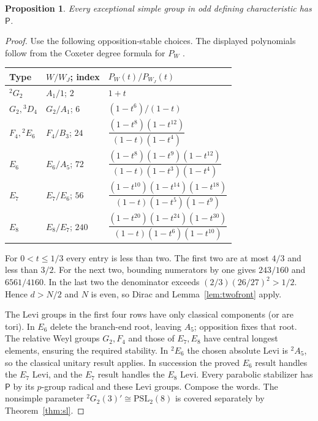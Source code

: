 \documentclass[11pt]{article}
\newtheorem{proposition}[theorem]{Proposition}
\theoremstyle{definition}
\newcommand{\Pp}{\mathsf P}
\newcommand{\PSL}{\mathrm{PSL}}
\begin{document}
\begin{proposition}\label{prop:oddexceptional}
Every exceptional simple group in odd defining characteristic has $\Pp$.
\end{proposition}
\begin{proof}
Use the following opposition-stable choices. The displayed polynomials follow from the Coxeter degree formula for $P_W$ \cite{Humphreys}.
\begin{center}\small
\begin{tabular}{lll}
\toprule
Type & $W/W_J$; index & $P_W(t)/P_{W_J}(t)$\\
\midrule
$^2G_2$ & $A_1/1$; $2$ & $1+t$\\
$G_2,{}^3D_4$ & $G_2/A_1$; $6$ & $(1-t^6)/(1-t)$\\
$F_4,{}^2E_6$ & $F_4/B_3$; $24$ & $\dfrac{(1-t^8)(1-t^{12})}{(1-t)(1-t^4)}$\\[2mm]
$E_6$ & $E_6/A_5$; $72$ & $\dfrac{(1-t^8)(1-t^9)(1-t^{12})}{(1-t)(1-t^3)(1-t^4)}$\\[2mm]
$E_7$ & $E_7/E_6$; $56$ & $\dfrac{(1-t^{10})(1-t^{14})(1-t^{18})}{(1-t)(1-t^5)(1-t^9)}$\\[2mm]
$E_8$ & $E_8/E_7$; $240$ & $\dfrac{(1-t^{20})(1-t^{24})(1-t^{30})}{(1-t)(1-t^6)(1-t^{10})}$\\
\bottomrule
\end{tabular}
\end{center}
For $0<t\le1/3$ every entry is less than two. The first two are at most $4/3$ and less than $3/2$. For the next two, bounding numerators by one gives $243/160$ and $6561/4160$. In the last two the denominator exceeds $(2/3)(26/27)^2>1/2$. Hence $d>N/2$ and $N$ is even, so Dirac and Lemma~\ref{lem:twofront} apply.

The Levi groups in the first four rows have only classical components (or are tori). In $E_6$ delete the branch-end root, leaving $A_5$; opposition fixes that root. The relative Weyl groups $G_2,F_4$ and those of $E_7,E_8$ have central longest elements, ensuring the required stability. In $^2E_6$ the chosen absolute Levi is $^2A_5$, so the classical unitary result applies. In succession the proved $E_6$ result handles the $E_7$ Levi, and the $E_7$ result handles the $E_8$ Levi. Every parabolic stabilizer has $\Pp$ by its $p$-group radical and these Levi groups. Compose the words. The nonsimple parameter $^2G_2(3)'\cong\PSL_2(8)$ is covered separately by Theorem~\ref{thm:sl}.
\end{proof}
\end{document}
